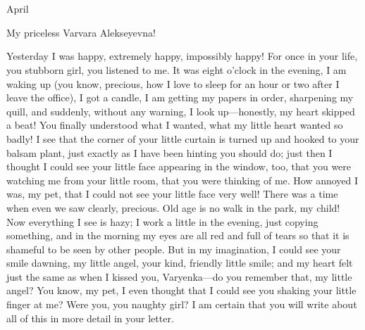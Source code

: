 \chapter*{}


\begin{flushright}
	April 
\end{flushright}

My priceless Varvara Alekseyevna!

Yesterday I was happy, extremely happy, impossibly happy! For once in your life, you stubborn girl, you listened to me. It was eight o'clock in the evening, I am waking up (you know, precious, how I love to sleep for an hour or two after I leave the office), I got a candle, I am getting my papers in order, sharpening my quill, and suddenly, without any warning, I look up---honestly, my heart skipped a beat! You finally understood what I wanted, what my little heart wanted so badly! I see that the corner of your little curtain is turned up and hooked to your balsam plant, just exactly as I have been hinting you should do; just then I thought I could see your little face appearing in the window, too, that you were watching me from your little room, that you were thinking of me. How annoyed I was, my pet, that I could not see your little face very well! There was a time when even we saw clearly, precious. Old age is no walk in the park, my child! Now everything I see is hazy; I work a little in the evening, just copying something, and in the morning my eyes are all red and full of tears so that it is shameful to be seen by other people. But in my imagination, I could see your smile dawning, my little angel, your kind, friendly little smile; and my heart felt just the same as when I kissed you, Varyenka---do you remember that, my little angel? You know, my pet, I even thought that I could see you shaking your little finger at me? Were you, you naughty girl? I am certain that you will write about all of this in more detail in your letter.

